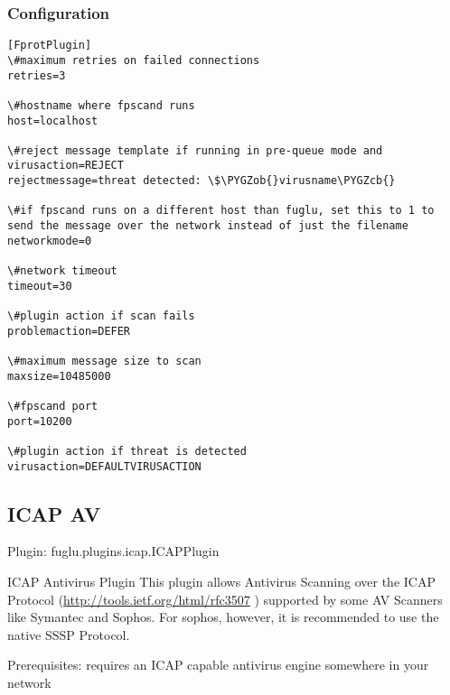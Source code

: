 \documentclass[letterpaper,10pt,english]{sphinxmanual}
\def\PYGZob{\char`\{}
\def\PYGZcb{\char`\}}
\begin{document}
\subsubsection{Configuration}
\label{plugins-index:id6}
\begin{Verbatim}[commandchars=\\\{\}]
[FprotPlugin]
\#maximum retries on failed connections
retries=3

\#hostname where fpscand runs
host=localhost

\#reject message template if running in pre-queue mode and virusaction=REJECT
rejectmessage=threat detected: \$\PYGZob{}virusname\PYGZcb{}

\#if fpscand runs on a different host than fuglu, set this to 1 to send the message over the network instead of just the filename
networkmode=0

\#network timeout
timeout=30

\#plugin action if scan fails
problemaction=DEFER

\#maximum message size to scan
maxsize=10485000

\#fpscand port
port=10200

\#plugin action if threat is detected
virusaction=DEFAULTVIRUSACTION
\end{Verbatim}


\subsection{ICAP AV}
\label{plugins-index:icap-av}
Plugin: fuglu.plugins.icap.ICAPPlugin

ICAP Antivirus Plugin
This plugin allows Antivirus Scanning over the ICAP Protocol (\href{http://tools.ietf.org/html/rfc3507}{http://tools.ietf.org/html/rfc3507} )
supported by some AV Scanners like Symantec and Sophos. For sophos, however, it is recommended to use the native SSSP Protocol.

Prerequisites: requires an ICAP capable antivirus engine somewhere in your network
\end{document}

